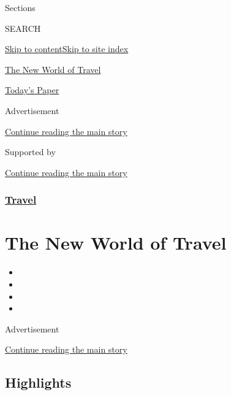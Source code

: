 Sections

SEARCH

\protect\hyperlink{site-content}{Skip to
content}\protect\hyperlink{site-index}{Skip to site index}

\href{https://www.nytimes3xbfgragh.onion/spotlight/the-new-world-of-travel}{The
New World of Travel}

\href{https://myaccount.nytimes3xbfgragh.onion/auth/login?response_type=cookie\&client_id=vi}{}

\href{https://www.nytimes3xbfgragh.onion/section/todayspaper}{Today's
Paper}

Advertisement

\protect\hyperlink{after-top}{Continue reading the main story}

Supported by

\protect\hyperlink{after-sponsor}{Continue reading the main story}

\hypertarget{travel}{%
\subsubsection{\texorpdfstring{\href{/section/travel}{Travel}}{Travel}}\label{travel}}

\hypertarget{the-new-world-of-travel}{%
\section{The New World of Travel}\label{the-new-world-of-travel}}

\begin{itemize}
\item
\item
\item
\item
\end{itemize}

Advertisement

\protect\hyperlink{after-subheader}{Continue reading the main story}

\hypertarget{highlights}{%
\subsection{Highlights}\label{highlights}}


